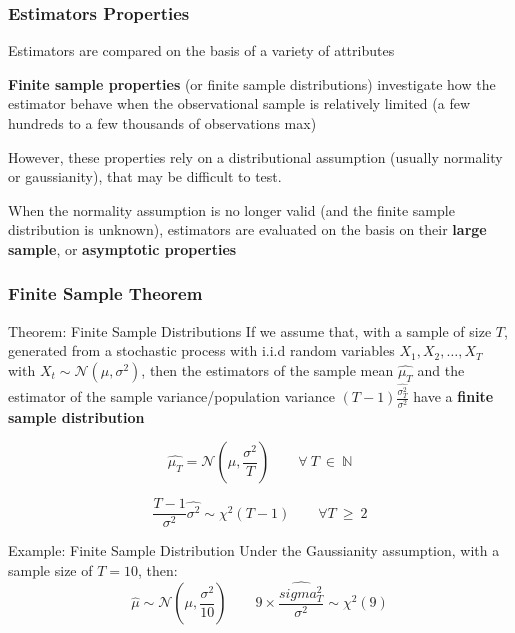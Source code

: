 \documentclass{beamer}
\newenvironment{wideenumerate}{\enumerate\addtolength{\itemsep}{10pt}}{\endenumerate}
\begin{document}
  \begin{frame}
    \frametitle{Estimators Properties}
    Estimators are compared on the basis of a variety of attributes

    \begin{wideenumerate}
      \item \textbf{Finite sample properties} (or finite sample distributions) investigate how the estimator behave when the observational sample is relatively limited (a few hundreds to a few thousands of observations max)
      \item However, these properties rely on a distributional assumption (usually normality or gaussianity), that may be difficult to test. 
      \item When the normality assumption is no longer valid (and the finite sample distribution is unknown), estimators are evaluated on the basis on their \textbf{large sample}, or \textbf{asymptotic properties}
    \end{wideenumerate}
    
  \end{frame}



  \begin{frame}
    \frametitle{Finite Sample Theorem}
    \begin{block}{Theorem: Finite Sample Distributions}
        If we assume that, with a sample of size $T$, generated from a stochastic process with i.i.d random variables $X_1, X_2, \dots, X_T$  with $X_{t} \sim \mathcal{N}(\mu, \sigma^2)$, then the estimators of the sample mean $\hat{\mu_T}$ and the estimator of the sample variance/population variance $(T-1) \frac{\hat{\sigma^2_T}}{\sigma^2}$ have a \textbf{finite sample distribution}

        \begin{equation*}
          \hat{\mu_T} = \mathcal{N}\left(\mu, \frac{\sigma^2}{T} \right) \qquad \forall \ T \ \in \ \mathbb{N}
        \end{equation*}


        \begin{equation*}
          \frac{T-1}{\sigma^2} \hat{\sigma^2} \sim \chi^{2} (T-1) \qquad \forall T \ \geq \ 2
        \end{equation*}
        
      \end{block}
\end{frame}


\begin{frame}
      \begin{exampleblock}{Example: Finite Sample Distribution}
        Under the Gaussianity assumption, with a sample size of $T = 10$, then:
        \begin{equation*}
          \hat{\mu} \sim \mathcal{N}\left( \mu, \frac{\sigma^2}{10} \right) \qquad 9 \times \frac{\hat{sigma^2_T}}{\sigma^2} \sim \chi^2(9)
        \end{equation*}        
      \end{exampleblock}
      
  \end{frame}
  
\end{document}
